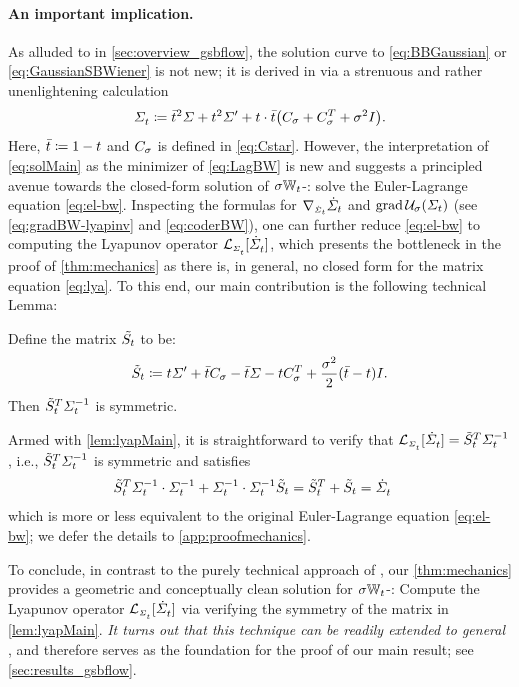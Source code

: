 \paragraph{An important implication.}
As alluded to in \cref{sec:overview_gsbflow}, the solution curve to \eqref{eq:BBGaussian} or \eqref{eq:GaussianSBWiener} is not new; it is derived in \citet{mallasto2021entropy} via a strenuous and rather unenlightening calculation
\begin{equation}
\label{eq:solMain}
\Sigmasol \defeq \ctimebar^2 \Sigma + \ctime^2 \Sigma' + \ctime\cdot\ctimebar\parens*{\C+\C^T + \sigma^2 \eye}.
\end{equation}
Here, $\bar{t} \coloneqq 1-t$ and $C_{\sigma}$ is defined in \eqref{eq:Cstar}. However, the interpretation of \eqref{eq:solMain} as the minimizer of \eqref{eq:LagBW} is new and suggests a principled avenue towards the closed-form solution of $\sigma\mathbb{W}_{t}$-: solve the Euler-Lagrange equation \eqref{eq:el-bw}.
Inspecting the formulas for $\nabla_{\scriptscriptstyle\dot{\Sigma}_{t}}\dot{\Sigma}_{t}$ and $\gradBW \penergyBW$ (see \eqref{eq:gradBW-lyapinv} and \eqref{eq:coderBW}), one can further reduce \eqref{eq:el-bw} to computing the Lyapunov operator $\lyap$, which presents the bottleneck in the proof of \cref{thm:mechanics} as there is, in general, no closed form for the matrix equation \eqref{eq:lya}. To this end, our main contribution is the following technical Lemma:
\begin{lemma}\label{lem:lyapMain}
Define the matrix $\tilde{S_{t}}$ to be:
\begin{equation}
\label{eq:HtMain}
\tilde{S}_{t} \coloneqq t\Sigma' + \bar{t} C_{\sigma} - \bar{t}\Sigma - tC_{\sigma}^T  + \frac{\sigma^2}{2}(\bar{t}-t)I.
\end{equation}Then $\tilde{S}_{t}^T \Sigma^{-1}_{ t }$ is symmetric.
\end{lemma}
Armed with \cref{lem:lyapMain}, it is straightforward to verify that $\lyap = \Ht^T \Sigmasolinv$, i.e., $\tilde{S}_{t}^T  \Sigma^{-1}_{ t }$ is symmetric and satisfies
\begin{align}
   \tilde{S}_{t}^T \Sigma^{-1}_{ t } \cdot \Sigma^{-1}_{ t } + \Sigma^{-1}_{ t } \cdot\Sigma^{-1}_{ t } \tilde{S}_{t} &= \tilde{S}_{t}^T  +  \tilde{S}_{t}= \dot{\Sigma}^{}_{ t }
\end{align}which is more or less equivalent to the original Euler-Lagrange equation \eqref{eq:el-bw}; we defer the details to \cref{app:proofmechanics}.

To conclude, in contrast to the purely technical approach of \citet{mallasto2021entropy}, our \cref{thm:mechanics} provides a geometric and conceptually clean solution for $\sigma\mathbb{W}_{t}$-: Compute the Lyapunov operator $\lyap$ via verifying the symmetry of the matrix in \cref{lem:lyapMain}. \emph{It turns out that this technique can be readily extended to general }, and therefore serves as the foundation for the proof of our main result; see \cref{sec:results_gsbflow}.

